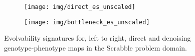\begin{figure}
  \begin{subfigure}[b]{0.5\textwidth}
          \texttt{[image: img/direct\_es\_unscaled]}
  \end{subfigure}%
  \begin{subfigure}[b]{0.5\textwidth}
          \texttt{[image: img/bottleneck\_es\_unscaled]}
  \end{subfigure}%
  \caption{
    Evolvability signatures for, left to right, direct and denoising genotype-phenotype maps in the Scrabble problem domain.
  }\label{fig:scrabble_all_es}
\end{figure}

